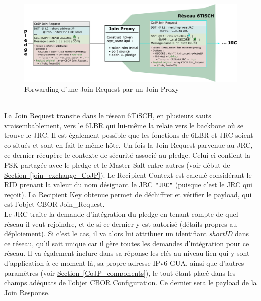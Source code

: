 \documentclass[]{report}
\newcommand{\minit}[1]{\noindent{\small\textbf{ \underline{#1}}}~\\}
\newcommand{\wordlink}[2]{\hyperref[#2]{#1~\ref{#2}}}
\begin{document}
\vspace{0.2cm}
	\begin{figure}[!h]
	\centering
	\includegraphics[width=\linewidth]{Join_Request}
	\caption{Forwarding d'une Join Request par un Join Proxy}
	\label{fig:join_request}
	\end{figure}
\vspace{0.2cm}

\minit{JP $\rightarrow$ JRC (Join Request)}

La Join Request transite dans le réseau 6TiSCH, en plusieurs sauts vraisembablement, vers le 6LBR qui lui-même la relaie vers le backbone où se trouve le JRC. Il est également possible que les fonctions de 6LBR et JRC soient co-situés et sont en fait le même hôte. Un fois la Join Request parvenue au JRC, ce dernier récupère le contexte de sécurité associé au pledge. Celui-ci contient la PSK partagée avec le pledge et le Master Salt entre autres (voir début de \wordlink{Section}{join_exchange_CoJP}). Le Recipient Context est calculé considérant le RID prenant la valeur du nom désignant le JRC \texttt{"JRC"} (puisque c'est le JRC qui reçoit). La Recipient Key obtenue permet de déchiffrer et vérifier le payload, qui est l'objet CBOR Join\_Request.\\

Le JRC traite la demande d'intégration du pledge en tenant compte de quel réseau il veut rejoindre, et de si ce dernier y est autorisé (détails propres au déploiement). Si c'est le cas, il va alors lui attribuer un identifiant \textit{shortID} dans ce réseau, qu'il sait unique car il gère toutes les demandes d'intégration pour ce réseau. Il va également inclure dans sa réponse les clés au niveau lien qui y sont d'application à ce moment là, sa propre adresse IPv6 GUA, ainsi que d'autres paramètres (voir \wordlink{Section}{CoJP_components}), le tout étant placé dans les champs adéquats de l'objet CBOR Configuration. Ce dernier sera le payload de la Join Response.\\

\vspace{0.4cm}
\end{document}

